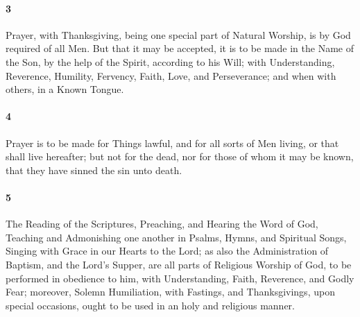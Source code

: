 \documentclass[
    paper=letterpaper,
    11pt,
    twoside,
    DIV=calc,
    openany
]{scrbook}
\newcommand{\ERRATA}[1]{}
\begin{document}
\footnotebegin
\ERRATA{
1688 & 1719: John 6:23
}
\footnoteend

\paragraph{3} %
Prayer, with Thanksgiving, being one special part of Natural Worship, is by God required of \R{}all Men. But that it may be accepted, it is to be made in the \R{}Name of the Son, by the help \R{}of the Spirit, according to \R{}his Will; with Understanding, Reverence, Humility, Fervency, Faith, Love, and Perseverance; and when with others, in a \R{}Known Tongue.

\footnotebegin
{}
\footnoteend

\paragraph{4} %
Prayer is to be made for Things lawful, and for all sorts of Men living, \R{}or that shall live hereafter; but not \R{}for the dead, nor for those of whom it may be known, that they have sinned \R{}the sin unto death.

\footnotebegin
{}
\footnoteend

\paragraph{5} %
The \R{}Reading of the Scriptures, Preaching, and \R{}Hearing the Word of God, Teaching and Admonishing one another in Psalms, Hymns, and Spiritual Songs, Singing with Grace in our Hearts to \R{}the Lord; as also the Administration \R{}of Baptism, and \R{}the Lord’s Supper, are all parts of Religious Worship of God, to be performed in obedience to him, with Understanding, Faith, Reverence, and Godly Fear; moreover, Solemn Humiliation, \R{}with Fastings, and Thanksgivings, upon \R{}special occasions, ought to be used in an holy and religious manner.

\footnotebegin
{}
\footnoteend
\end{document}
